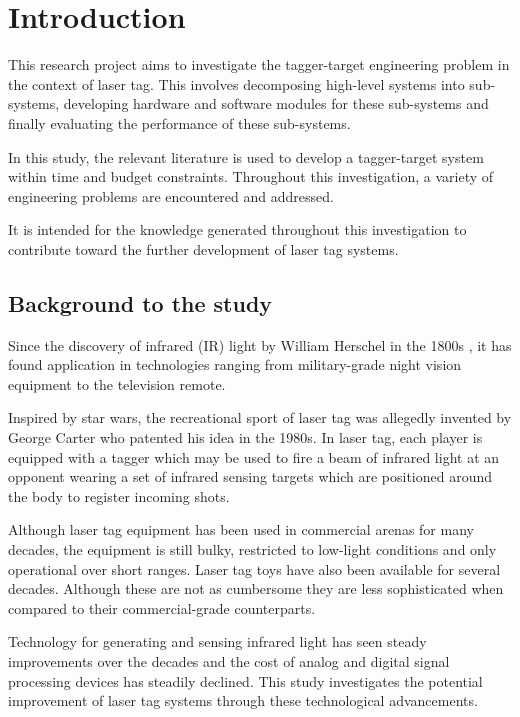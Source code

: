 \chapter{Introduction}
\label{ch_introduction}

This research project aims to investigate the tagger-target engineering problem in the context of laser tag.  This involves decomposing high-level systems into sub-systems, developing hardware and software modules for these sub-systems and finally evaluating the performance of these sub-systems.

In this study, the relevant literature is used to develop a tagger-target system within time and budget constraints. Throughout this investigation, a variety of engineering problems are encountered and addressed.

It is intended for the knowledge generated throughout this investigation to contribute toward the further development of laser tag systems.

\section{Background to the study}
Since the discovery of infrared (IR) light by William Herschel in the 1800s \cite{Rowan-Robinson2013}, it has found application in technologies ranging from military-grade night vision equipment to the television remote.

Inspired by star wars, the recreational sport of laser tag was allegedly invented by George Carter who patented his idea in the 1980s\cite{Carter1986}. In laser tag, each player is equipped with a tagger which may be used to fire a beam of infrared light at an opponent wearing a set of infrared sensing targets which are positioned around the body to register incoming shots.

Although laser tag equipment has been used in commercial arenas for many decades, the equipment is still bulky, restricted to low-light conditions and only operational over short ranges. Laser tag toys have also been available for several decades. Although these are not as cumbersome they are less sophisticated when compared to their commercial-grade counterparts.

Technology for generating and sensing infrared light has seen steady improvements over the decades and the cost of analog and digital signal processing devices has steadily declined. This study investigates the potential improvement of laser tag systems through these technological advancements.

